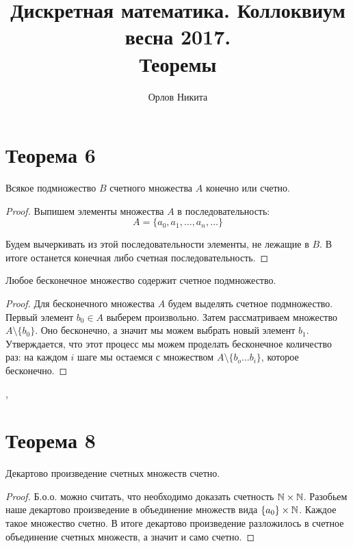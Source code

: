 \documentclass[a4paper,12pt]{article}
\begin{document}
	\title{Дискретная математика. Коллоквиум весна 2017. \\ Теоремы}
	\author{Орлов Никита}
	\maketitle
	\tableofcontents
    \pagebreak
	\section{Теорема 6}
	\begin{theorem}
		Всякое подмножество $B$ счетного множества $A$ конечно или счетно.
	\end{theorem}
	\begin{proof}
		Выпишем элементы множества $A$ в последовательность:
		\[
		A = \{a_0, a_1, \ldots, a_n, \ldots \}
		\]
		
		Будем вычеркивать из этой последовательности элементы, не лежащие в $B$. В итоге останется конечная либо счетная последовательность. 
	\end{proof}

	\begin{theorem}
		Любое бесконечное множество содержит счетное подмножество.
	\end{theorem}
	\begin{proof}
		Для бесконечного множества $A$ будем выделять счетное подмножество. Первый элемент $b_0 \in A$ выберем произвольно. Затем рассматриваем множество $A \setminus \{b_0\}$. Оно бесконечно, а значит мы можем выбрать новый элемент $b_1$. Утверждается, что этот процесс мы можем проделать бесконечное количество раз: на каждом $i$ шаге мы остаемся с множеством $A \setminus \{b_o \ldots b_i\}$, которое бесконечно.
	\end{proof}
    
	\sep	
	
	
	\section{Теорема 8}
	
	\begin{theorem}
		Декартово произведение счетных множеств счетно.
	\end{theorem}
	\begin{proof}
		Б.о.о. можно считать, что необходимо доказать счетность $\mathbb{N} \times \mathbb{N}$. Разобьем наше декартово произведение в объединение множеств вида $ \{a_0\} \times \mathbb{N} $. Каждое такое множество счетно. В итоге декартово произведение разложилось в счетное объединение счетных множеств, а значит и само счетно.
	\end{proof}
	
\end{document}
